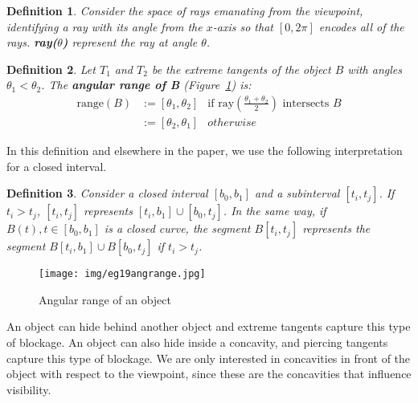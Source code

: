 \documentclass[10pt,twocolumn]{article}
\newtheorem{defn2}{Definition}
\begin{document}
\begin{defn2}
Consider the space of rays emanating from the viewpoint, identifying
a ray with its angle from the $x$-axis so that $[0,2\pi]$ encodes
all of the rays.
{\bf ray($\theta$)} represent the ray at angle $\theta$.
\end{defn2}
\begin{defn2} 
\label{defn:objectrange}
Let $T_1$ and $T_2$ be the extreme tangents of the object $B$
with angles $\theta_1 < \theta_2$.
The {\bf angular range of B} (Figure~\ref{fig:range}) is:
\begin{eqnarray*}
\mbox{range}(B) & :=[\theta_1,\theta_2] & \mbox{if ray} 
(\frac{\theta_1 + \theta_2}{2})
\mbox{ intersects } B \\
              & := [\theta_2, \theta_1] & otherwise
\end{eqnarray*}
\end{defn2}

In this definition and elsewhere in the paper,
we use the following interpretation for a closed interval.

\begin{defn2}
Consider a closed interval $[b_0,b_1]$ and a subinterval $[t_i,t_j]$.
If $t_i > t_j$, $[t_i,t_j]$ represents $[t_i,b_1] \cup [b_0,t_j]$.
In the same way, if $B(t), t \in [b_0,b_1]$ is a closed curve,
the segment {\bf $B[t_i,t_j]$} 
represents the segment $B[t_i,b_1] \cup B[b_0,t_j]$ if $t_i > t_j$.
\end{defn2}

\begin{figure}
\begin{center}
\texttt{[image: img/eg19angrange.jpg]}
\end{center}
\caption{Angular range of an object}
\label{fig:range}
\end{figure}



An object can hide behind another object and extreme tangents 
capture this type of blockage.
An object can also hide inside a concavity,
and piercing tangents capture this type of blockage.
We are only interested in concavities in front of the object
with respect to the viewpoint, since these are the concavities that influence visibility.
\end{document}

